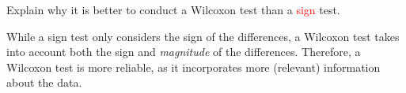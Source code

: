 \documentclass[../Notes.tex]{subfiles}
\begin{document}
\begin{note}
  Explain why it is better to conduct a \textcolor{green!70!black}{Wilcoxon} test than a \textcolor{red}{sign} test.
  \begin{center}
    \parbox{0.9\textwidth}{
     While a sign test only considers the sign of the differences, a Wilcoxon test takes into account both the sign and \emph{magnitude} of the differences. Therefore, a Wilcoxon test is more reliable, as it incorporates more (relevant) information about the data.
    }
  \end{center}
      
\end{note}
      
\end{document}
